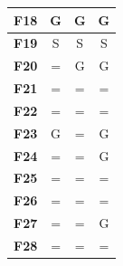 \documentclass[12pt,a4paper]{report}
\begin{document}
{{{{{{{\begin{table}[]
\begin{tabular}{|l|c|c|c|}
{\bf F18}                     & G        & G         & G         \\ \hline
{\bf F19}                     & S        & S         & S         \\ \hline
{\bf F20}                     & =        & G         & G         \\ \hline
{\bf F21}                     & =        & =         & =         \\ \hline
{\bf F22}                     & =        & =         & =         \\ \hline
{\bf F23}                     & G        & =         & G         \\ \hline
{\bf F24}                     & =        & =         & G         \\ \hline
{\bf F25}                     & =        & =         & =         \\ \hline
{\bf F26}                     & =        & =         & =         \\ \hline
{\bf F27}                     & =        & =         & G         \\ \hline
{\bf F28}                     & =        & =         & =         \\ \hline
\end{tabular}
\end{table}

}}}}}}}
\end{document}
